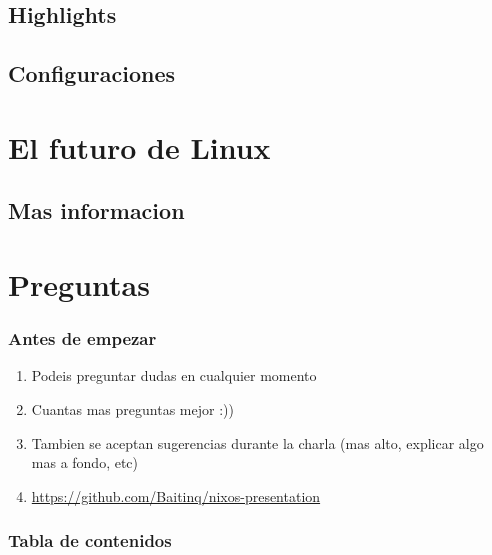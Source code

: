 \documentclass[aspectratio=43]{beamer}
\begin{document}
\subsection{Highlights}
\subsection{Configuraciones}
\section{El futuro de Linux}
\subsection{Mas informacion}
\section{Preguntas}


\begin{frame}
    \frametitle{Antes de empezar}
    \begin{enumerate}
        \item{Podeis preguntar dudas en cualquier momento}
        \item{Cuantas mas preguntas mejor :))}
        \item{Tambien se aceptan sugerencias durante la charla (mas alto, explicar algo mas a fondo, etc)}
        \item{\href{https://github.com/Baitinq/nixos-presentation}{https://github.com/Baitinq/nixos-presentation}}
    \end{enumerate}
\end{frame}

\begin{frame}
    \frametitle{Tabla de contenidos} %
    \tableofcontents %
\end{frame}
\end{document}
